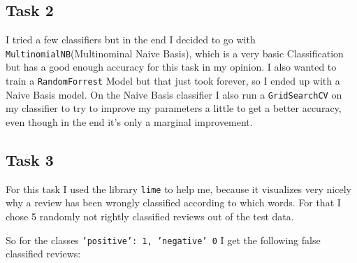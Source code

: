 \documentclass[11pt,a4paper]{article}
\begin{document}
\subsection{Task 2}
I tried a few classifiers but in the end I decided to go with \texttt{MultinomialNB}(Multinominal Naive Basis), which is a very basic Classification but has a good enough accuracy for this task in my opinion.
I also wanted to train a \texttt{RandomForrest} Model but that just took forever, so I ended up with a Naive Basis model.
On the Naive Basis classifier I also run a \texttt{GridSearchCV} on my classifier to try to improve my parameters a little to get a better accuracy, even though in the end it's only a marginal improvement.



\subsection{Task 3}

For this task I used the library \texttt{lime} to help me, because it visualizes very nicely why a review has been wrongly classified according to which words.
For that I chose 5 randomly not rightly classified reviews out of the test data.

So for the classes \texttt{{'positive': 1, 'negative' 0}} I get the following false classified reviews:










\end{document}
